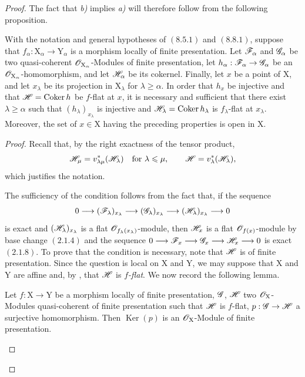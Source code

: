 \begin{proof}
The fact that \emph{b)} implies \emph{a)} will therefore follow from the following proposition.

\begin{proposition}[11.3.9]
\label{IV.11.3.9}
With the notation and general hypotheses of $(8.5.1)$ and $(8.8.1)$, suppose that $f_\alpha:\mathrm{X}_\alpha\to\mathrm{Y}_\alpha$ is a morphism locally of finite presentation. Let $\mathscr{F}_\alpha$ and $\mathscr{G}_\alpha$ be two quasi-coherent $\mathscr{O}_{\mathrm{X}_\alpha}$-Modules of finite presentation, let $h_\alpha:\mathscr{F}_\alpha\to\mathscr{G}_\alpha$ be an $\mathscr{O}_{\mathrm{X}_\alpha}$-homomorphism, and let $\mathscr{H}_\alpha$ be its cokernel. Finally, let $x$ be a point of $\mathrm{X}$, and let $x_\lambda$ be its projection in $\mathrm{X}_\lambda$ for $\lambda\geqslant\alpha$. In order that $h_x$ be injective and that $\mathscr{H}=\operatorname{Coker}h$ be $f$-flat at $x$, it is necessary and sufficient that there exist $\lambda\geqslant\alpha$ such that $(h_\lambda)_{x_\lambda}$ is injective and $\mathscr{H}_\lambda=\operatorname{Coker}h_\lambda$ is $f_\lambda$-flat at $x_\lambda$. Moreover, the set of $x\in\mathrm{X}$ having the preceding properties is open in $\mathrm{X}$.
\end{proposition}

\begin{proof}
Recall that, by the right exactness of the tensor product,
\[
  \mathscr{H}_\mu=v^*_{\lambda\mu}(\mathscr{H}_\lambda)
  \quad\text{for }\lambda\leqslant\mu,
  \qquad
  \mathscr{H}=v^*_\lambda(\mathscr{H}_\lambda),
\]
which justifies the notation.

The sufficiency of the condition follows from the fact that, if the sequence
\[
  0\longrightarrow(\mathscr{F}_\lambda)_{x_\lambda}
  \longrightarrow(\mathscr{G}_\lambda)_{x_\lambda}
  \longrightarrow(\mathscr{H}_\lambda)_{x_\lambda}
  \longrightarrow0
\]
is exact and $(\mathscr{H}_\lambda)_{x_\lambda}$ is a flat $\mathscr{O}_{f_\lambda(x_\lambda)}$-module, then $\mathscr{H}_x$ is a flat $\mathscr{O}_{f(x)}$-module by base change $(2.1.4)$ and the sequence $0\longrightarrow\mathscr{F}_x
\longrightarrow\mathscr{G}_x
\longrightarrow\mathscr{H}_x
\longrightarrow0$
is exact $(2.1.8)$. To prove that
the condition is necessary, note that $\mathscr{H}$ is of finite presentation. Since the question is local on $\mathrm{X}$ and $\mathrm{Y}$, we may suppose that $\mathrm{X}$ and $\mathrm{Y}$ are affine and, by , that $\mathscr{H}$ is \emph{$f$-flat}. We now record the following lemma.

\begin{lemma}[11.3.9.1]
\label{IV.11.3.9.1}
Let $f:\mathrm{X}\to\mathrm{Y}$ be a morphism locally of finite presentation, $\mathscr{G}$, $\mathscr{H}$ two $\mathscr{O}_\mathrm{X}$-Modules quasi-coherent of finite presentation such that $\mathscr{H}$ is $f$-flat, $p:\mathscr{G}\to\mathscr{H}$ a surjective homomorphism. Then $\operatorname{Ker}(p)$ is an $\mathscr{O}_\mathrm{X}$-Module of finite presentation.
\end{lemma}


\end{proof}
\end{proof}
